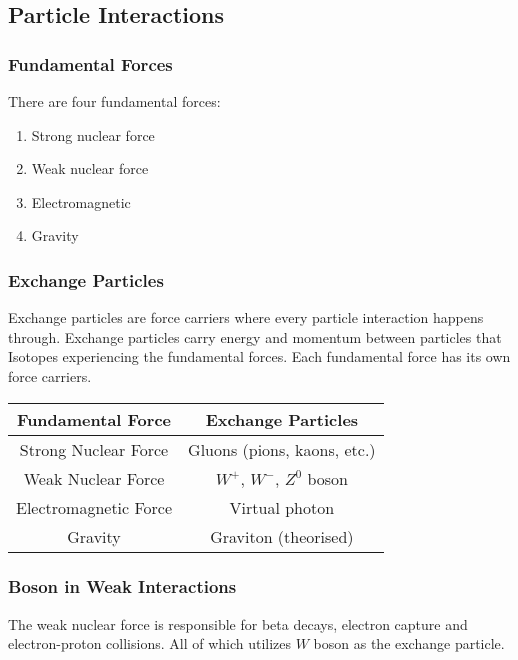 \documentclass[10pt]{article}
\makeatletter
\newenvironment{tablehere}
  {\def\@captype{table}}
  {}
\makeatother
\begin{document}
\begin{multicols}{2}
	\subsection{Particle Interactions}
	\subsubsection{Fundamental Forces}
	There are four fundamental forces:
	\medskip
	\begin{enumerate}
		\item Strong nuclear force
		\item Weak nuclear force
		\item Electromagnetic
		\item Gravity
	\end{enumerate}

	\subsubsection{Exchange Particles}
	Exchange particles are force carriers where every particle interaction happens
	through. Exchange particles carry energy and momentum between particles that
	Isotopes experiencing the fundamental forces. Each fundamental force has its own
	force carriers.

	\begin{center}
		\begin{tablehere}
			\begin{tabular}{|c|c|}
				\hline
				Fundamental Force     & Exchange Particles          \\
				\hline
				Strong Nuclear Force  & Gluons (pions, kaons, etc.) \\
				Weak Nuclear Force    & $W^+$, $W^-$, $Z^0$ boson   \\
				Electromagnetic Force & Virtual photon              \\
				Gravity               & Graviton (theorised)        \\
				\hline
			\end{tabular}
		\end{tablehere}
	\end{center}

	\subsubsection{Boson in Weak Interactions}
	The weak nuclear force is responsible for beta decays, electron capture and
	electron-proton collisions. All of which utilizes $W$ boson as the exchange
	particle.


\end{multicols}
\end{document}
